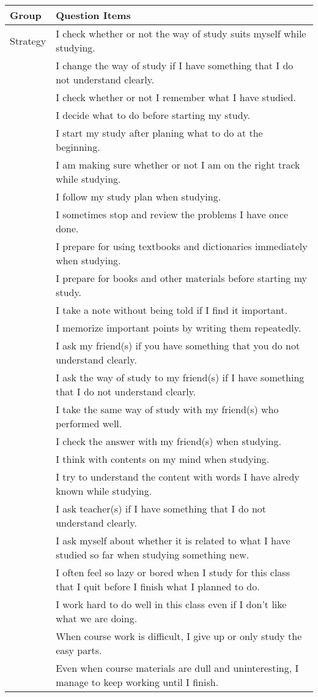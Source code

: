 \begin{tabular}{lp{13cm}}
\hline \hline 
Group & Question Items \\
\hline 
Strategy & I check whether or not the way of study suits myself while studying. \\
 & I change the way of study if I have something that I do not understand clearly. \\
 & I check whether or not I remember what I have studied. \\
 & I decide what to do before starting my study. \\
 & I start my study after planing what to do at the beginning. \\
 & I am making sure whether or not I am on the right track while studying. \\
 & I follow my study plan when studying. \\
 & I sometimes stop and review the problems I have once done. \\
 & I prepare for using textbooks and dictionaries immediately when studying. \\
 & I prepare for books and other materials before starting my study. \\
 & I take a note without being told if I find it important. \\
 & I memorize important points by writing them repeatedly. \\
 & I ask my friend(s) if you have something that you do not understand clearly. \\
 & I ask the way of study to my friend(s) if I have something that I do not understand clearly. \\
 & I take the same way of study with my friend(s) who performed well. \\
 & I check the answer with my friend(s) when studying. \\
 & I think with contents on my mind when studying. \\
 & I try to understand the content with words I have alredy known while studying. \\
 & I ask teacher(s) if I have something that I do not understand clearly. \\
 & I ask myself about whether it is related to what I have studied so far when studying something new. \\
 & I often feel so lazy or bored when I study for this class that I quit before I finish what I planned to do. \\
 & I work hard to do well in this class even if I don't like what we are doing. \\
 & When course work is difficult, I give up or only study the easy parts. \\
 & Even when course materials are dull and uninteresting, I manage to keep working until I finish. \\
\hline \hline
\end{tabular}